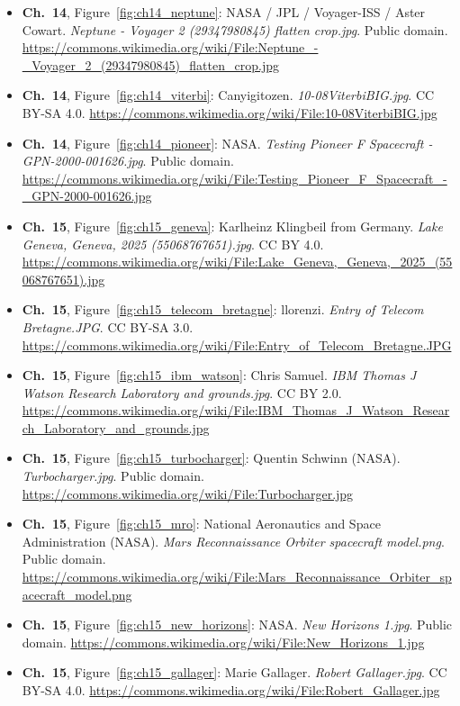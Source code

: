 \begin{small}
\begin{itemize}[leftmargin=0pt,itemsep=2pt,label={}]
\item \textbf{Ch.~14}, Figure~\ref{fig:ch14_neptune}: NASA / JPL / Voyager-ISS / Aster Cowart. \emph{Neptune -\allowbreak{} Voyager 2 (29347980845) flatten crop.\allowbreak{}jpg}. Public domain. \url{https://commons.wikimedia.org/wiki/File:Neptune_-_Voyager_2_(29347980845)_flatten_crop.jpg}
\item \textbf{Ch.~14}, Figure~\ref{fig:ch14_viterbi}: Canyigitozen. \emph{10-\allowbreak{}08ViterbiBIG.\allowbreak{}jpg}. CC BY-SA 4.0. \url{https://commons.wikimedia.org/wiki/File:10-08ViterbiBIG.jpg}
\item \textbf{Ch.~14}, Figure~\ref{fig:ch14_pioneer}: NASA. \emph{Testing Pioneer F Spacecraft -\allowbreak{} GPN-\allowbreak{}2000-\allowbreak{}001626.\allowbreak{}jpg}. Public domain. \url{https://commons.wikimedia.org/wiki/File:Testing_Pioneer_F_Spacecraft_-_GPN-2000-001626.jpg}
\item \textbf{Ch.~15}, Figure~\ref{fig:ch15_geneva}: Karlheinz Klingbeil from Germany. \emph{Lake Geneva, Geneva, 2025 (55068767651).\allowbreak{}jpg}. CC BY 4.0. \url{https://commons.wikimedia.org/wiki/File:Lake_Geneva,_Geneva,_2025_(55068767651).jpg}
\item \textbf{Ch.~15}, Figure~\ref{fig:ch15_telecom_bretagne}: llorenzi. \emph{Entry of Telecom Bretagne.\allowbreak{}JPG}. CC BY-SA 3.0. \url{https://commons.wikimedia.org/wiki/File:Entry_of_Telecom_Bretagne.JPG}
\item \textbf{Ch.~15}, Figure~\ref{fig:ch15_ibm_watson}: Chris Samuel. \emph{IBM Thomas J Watson Research Laboratory and grounds.\allowbreak{}jpg}. CC BY 2.0. \url{https://commons.wikimedia.org/wiki/File:IBM_Thomas_J_Watson_Research_Laboratory_and_grounds.jpg}
\item \textbf{Ch.~15}, Figure~\ref{fig:ch15_turbocharger}: Quentin Schwinn (NASA). \emph{Turbocharger.\allowbreak{}jpg}. Public domain. \url{https://commons.wikimedia.org/wiki/File:Turbocharger.jpg}
\item \textbf{Ch.~15}, Figure~\ref{fig:ch15_mro}: National Aeronautics and Space Administration (NASA). \emph{Mars Reconnaissance Orbiter spacecraft model.\allowbreak{}png}. Public domain. \url{https://commons.wikimedia.org/wiki/File:Mars_Reconnaissance_Orbiter_spacecraft_model.png}
\item \textbf{Ch.~15}, Figure~\ref{fig:ch15_new_horizons}: NASA. \emph{New Horizons 1.\allowbreak{}jpg}. Public domain. \url{https://commons.wikimedia.org/wiki/File:New_Horizons_1.jpg}
\item \textbf{Ch.~15}, Figure~\ref{fig:ch15_gallager}: Marie Gallager. \emph{Robert Gallager.\allowbreak{}jpg}. CC BY-SA 4.0. \url{https://commons.wikimedia.org/wiki/File:Robert_Gallager.jpg}

\end{itemize}
\end{small}

